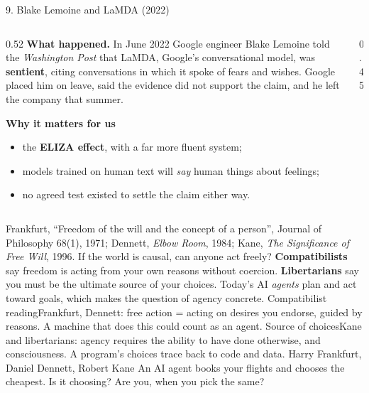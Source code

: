 \begin{frame}{9. Blake Lemoine and LaMDA (2022)}
\begin{columns}[T]
\begin{column}{0.52\textwidth}
\small
\textbf{What happened.} In June 2022 Google engineer Blake Lemoine told the \emph{Washington Post} that LaMDA, Google's conversational model, was \textbf{sentient}, citing conversations in which it spoke of fears and wishes. Google placed him on leave, said the evidence did not support the claim, and he left the company that summer.

\textbf{Why it matters for us}
\begin{itemize}\setlength\itemsep{2pt}
\item the \textbf{ELIZA effect}, with a far more fluent system;
\item models trained on human text will \emph{say} human things about feelings;
\item no agreed test existed to settle the claim either way.
\end{itemize}
\end{column}
\begin{column}{0.45\textwidth}
\vspace{2mm}\par
{}
\end{column}
\end{columns}
\end{frame}

{Frankfurt, ``Freedom of the will and the concept of a person'', Journal of Philosophy 68(1), 1971; Dennett, \emph{Elbow Room}, 1984; Kane, \emph{The Significance of Free Will}, 1996.}
{If the world is causal, can anyone act freely? \textbf{Compatibilists} say freedom is acting from your own reasons without coercion. \textbf{Libertarians} say you must be the ultimate source of your choices. Today's AI \emph{agents} plan and act toward goals, which makes the question of agency concrete.}
{Compatibilist reading}{Frankfurt, Dennett: free action = acting on desires you endorse, guided by reasons. A machine that does this could count as an agent.}
{Source of choices}{Kane and libertarians: agency requires the ability to have done otherwise, and consciousness. A program's choices trace back to code and data.}
{Harry Frankfurt, Daniel Dennett, Robert Kane}
{An AI agent books your flights and chooses the cheapest. Is it choosing? Are you, when you pick the same?}

